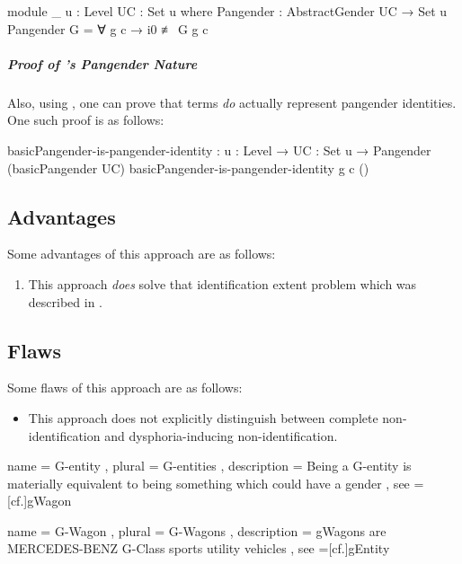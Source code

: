 \documentclass{article}
\theoremstyle{remark}
\begin{document}
\begin{code}
    module _ {u : Level} {UC : Set u} where
      Pangender : AbstractGender UC → Set u
      Pangender G = ∀ g c → i0 ≢ G g c
\end{code}

\subparagraph{Proof of 's Pangender Nature}
Also, using , one can prove that  terms \emph{do} actually represent pangender identities.  One such proof is as follows:

\begin{code}
    basicPangender-is-pangender-identity :
      {u : Level} → {UC : Set u} → Pangender (basicPangender UC)
    basicPangender-is-pangender-identity g c ()
\end{code}

\subsection{Advantages}
Some advantages of this approach are as follows:

\begin{enumerate}
  \item This approach \emph{does} solve that identification extent problem which was described in .\label{enum:gender8advantageExtent}
\end{enumerate}

\subsection{Flaws}
Some flaws of this approach are as follows:

\begin{itemize}
  \item This approach does not explicitly distinguish between complete non-identification and dysphoria-inducing non-identification.
\end{itemize}

\printbibliography{}

  { name = {G-entity}
  , plural = {G-entities}
  , description = Being a G-entity is materially equivalent to being something which could have a gender
  , see =[cf.]{gWagon}
  }

  { name = {G-Wagon}
  , plural = {G-Wagons}
  , description = \glspl{gWagon} are MERCEDES-BENZ G-Class sports utility vehicles
  , see =[cf.]{gEntity}
  }


\printglossary{}
\end{document}
